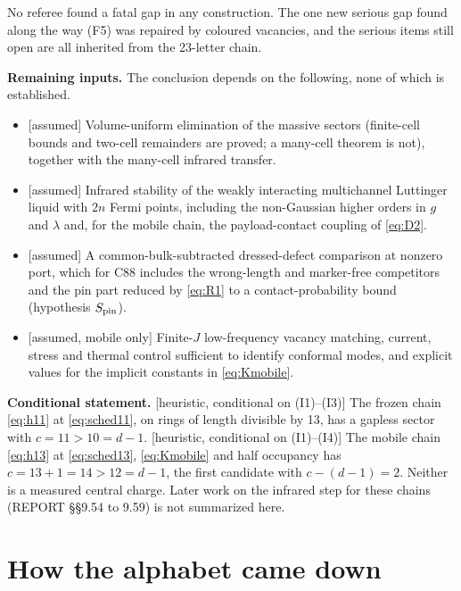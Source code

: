 \documentclass[11pt]{article}
\newcommand{\tg}[1]{\textsf{[#1]}}
\begin{document}
No referee found a fatal gap in any construction. The one new serious gap found along the way (F5) was repaired by coloured vacancies, and the serious items still open are all inherited from the 23-letter chain.

\textbf{Remaining inputs.} The conclusion depends on the following, none of which is established.
\begin{itemize}
\item[(I1)] \tg{assumed} Volume-uniform elimination of the massive sectors (finite-cell bounds and two-cell remainders are proved; a many-cell theorem is not), together with the many-cell infrared transfer.
\item[(I2)] \tg{assumed} Infrared stability of the weakly interacting multichannel Luttinger liquid with $2n$ Fermi points, including the non-Gaussian higher orders in $g$ and $\lambda$ and, for the mobile chain, the payload-contact coupling of \eqref{eq:D2}.
\item[(I3)] \tg{assumed} A common-bulk-subtracted dressed-defect comparison at nonzero port, which for C88 includes the wrong-length and marker-free competitors and the pin part reduced by \eqref{eq:R1} to a contact-probability bound (hypothesis $S_{\rm pin}$).
\item[(I4)] \tg{assumed, mobile only} Finite-$J$ low-frequency vacancy matching, current, stress and thermal control sufficient to identify conformal modes, and explicit values for the implicit constants in \eqref{eq:Kmobile}.
\end{itemize}

\textbf{Conditional statement.} \tg{heuristic, conditional on (I1)--(I3)} The frozen chain \eqref{eq:h11} at \eqref{eq:sched11}, on rings of length divisible by 13, has a gapless sector with $c=11>10=d-1$. \tg{heuristic, conditional on (I1)--(I4)} The mobile chain \eqref{eq:h13} at \eqref{eq:sched13}, \eqref{eq:Kmobile} and half occupancy has $c=13+1=14>12=d-1$, the first candidate with $c-(d-1)=2$. Neither is a measured central charge. Later work on the infrared step for these chains (REPORT \S\S9.54 to 9.59) is not summarized here.

\section{How the alphabet came down}\label{sec:history}
\end{document}
